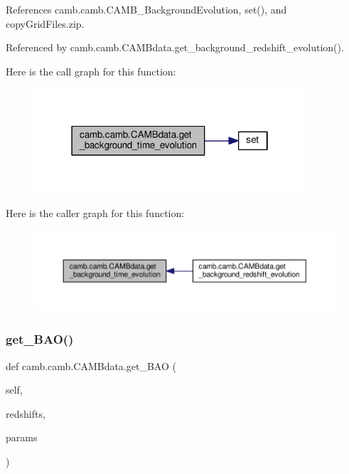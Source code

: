 References camb.\+camb.\+C\+A\+M\+B\+\_\+\+Background\+Evolution, set(), and copy\+Grid\+Files.\+zip.



Referenced by camb.\+camb.\+C\+A\+M\+Bdata.\+get\+\_\+background\+\_\+redshift\+\_\+evolution().

Here is the call graph for this function\+:
\nopagebreak
\begin{figure}[H]
\begin{center}
\leavevmode
\includegraphics[width=286pt]{classcamb_1_1camb_1_1CAMBdata_a07e53d4b201c37fd204545577717b42b_cgraph}
\end{center}
\end{figure}
Here is the caller graph for this function\+:
\nopagebreak
\begin{figure}[H]
\begin{center}
\leavevmode
\includegraphics[width=350pt]{classcamb_1_1camb_1_1CAMBdata_a07e53d4b201c37fd204545577717b42b_icgraph}
\end{center}
\end{figure}
\mbox{\label{classcamb_1_1camb_1_1CAMBdata_a4428c1c04012e8bfc4015656ed24412e}} 
\subsubsection{\texorpdfstring{get\+\_\+\+B\+A\+O()}{get\_BAO()}}
{\footnotesize\ttfamily def camb.\+camb.\+C\+A\+M\+Bdata.\+get\+\_\+\+B\+AO (\begin{DoxyParamCaption}\item[{}]{self,  }\item[{}]{redshifts,  }\item[{}]{params }\end{DoxyParamCaption})}


